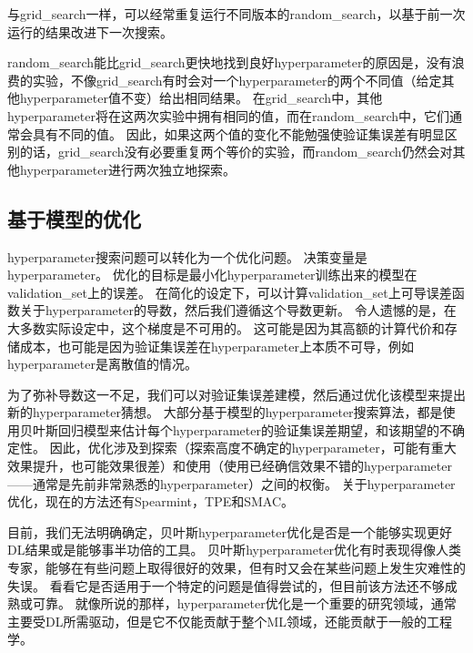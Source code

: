 与\gls{grid_search}一样，可以经常重复运行不同版本的\gls{random_search}，以基于前一次运行的结果改进下一次搜索。

\gls{random_search}能比\gls{grid_search}更快地找到良好\gls{hyperparameter}的原因是，没有浪费的实验，不像\gls{grid_search}有时会对一个\gls{hyperparameter}的两个不同值（给定其他\gls{hyperparameter}值不变）给出相同结果。
在\gls{grid_search}中，其他\gls{hyperparameter}将在这两次实验中拥有相同的值，而在\gls{random_search}中，它们通常会具有不同的值。
因此，如果这两个值的变化不能勉强使验证集误差有明显区别的话，\gls{grid_search}没有必要重复两个等价的实验，而\gls{random_search}仍然会对其他\gls{hyperparameter}进行两次独立地探索。


\subsection{基于模型的优化}
\label{sec:model_based_hyperparameter_optimization}
\gls{hyperparameter}搜索问题可以转化为一个优化问题。
决策变量是\gls{hyperparameter}。
优化的目标是最小化\gls{hyperparameter}训练出来的模型在\gls{validation_set}上的误差。
在简化的设定下，可以计算\gls{validation_set}上可导误差函数关于\gls{hyperparameter}的导数，然后我们遵循这个导数更新\citep{bengio:1999:snowbird,bengio-hyper-NC00,maclaurin2015gradient}。
令人遗憾的是，在大多数实际设定中，这个梯度是不可用的。
这可能是因为其高额的计算代价和存储成本，也可能是因为验证集误差在\gls{hyperparameter}上本质不可导，例如\gls{hyperparameter}是离散值的情况。

为了弥补导数这一不足，我们可以对验证集误差建模，然后通过优化该模型来提出新的\gls{hyperparameter}猜想。
大部分基于模型的\gls{hyperparameter}搜索算法，都是使用贝叶斯回归模型来估计每个\gls{hyperparameter}的验证集误差期望，和该期望的不确定性。
因此，优化涉及到探索（探索高度不确定的\gls{hyperparameter}，可能有重大效果提升，也可能效果很差）和使用（使用已经确信效果不错的\gls{hyperparameter}——通常是先前非常熟悉的\gls{hyperparameter}）之间的权衡。
关于\gls{hyperparameter}优化，现在的方法还有Spearmint\citep{Snoek+al-NIPS2012-small}，TPE\citep{Bergstra+al-NIPS2011}和SMAC\citep{hutter+hoos+leyton+brown:2011}。

目前，我们无法明确确定，贝叶斯\gls{hyperparameter}优化是否是一个能够实现更好\gls{DL}结果或是能够事半功倍的工具。
贝叶斯\gls{hyperparameter}优化有时表现得像人类专家，能够在有些问题上取得很好的效果，但有时又会在某些问题上发生灾难性的失误。
看看它是否适用于一个特定的问题是值得尝试的，但目前该方法还不够成熟或可靠。
就像所说的那样，\gls{hyperparameter}优化是一个重要的研究领域，通常主要受\gls{DL}所需驱动，但是它不仅能贡献于整个\gls{ML}领域，还能贡献于一般的工程学。


